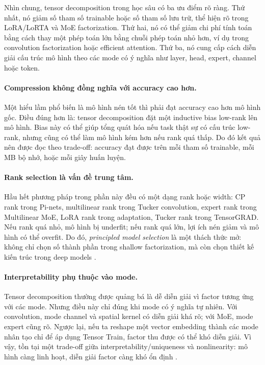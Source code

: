 Nhìn chung, tensor decomposition trong học sâu có ba ưu điểm rõ ràng. Thứ nhất, nó giảm
số tham số trainable hoặc số tham số lưu trữ, thể hiện rõ trong LoRA/LoRTA và MoE
factorization. Thứ hai, nó có thể giảm chi phí tính toán bằng cách thay một phép toán
lớn bằng chuỗi phép toán nhỏ hơn, ví dụ trong convolution factorization hoặc efficient
attention. Thứ ba, nó cung cấp cách diễn giải cấu trúc mô hình theo các mode có ý nghĩa
như layer, head, expert, channel hoặc token.

\paragraph{Compression không đồng nghĩa với accuracy cao hơn.}
Một hiểu lầm phổ biến là mô hình nén tốt thì phải đạt accuracy cao hơn mô hình gốc.
Điều đúng hơn là: tensor decomposition đặt một inductive bias low-rank lên mô hình.
Bias này có thể giúp tổng quát hóa nếu task thật sự có cấu trúc low-rank, nhưng cũng có
thể làm mô hình kém hơn nếu rank quá thấp. Do đó kết quả nên được đọc theo trade-off:
accuracy đạt được trên mỗi tham số trainable, mỗi MB bộ nhớ, hoặc mỗi giây huấn luyện.

\paragraph{Rank selection là vấn đề trung tâm.}
Hầu hết phương pháp trong phần này đều có một dạng rank hoặc width: CP rank trong
Pi-nets, multilinear rank trong Tucker convolution, expert rank trong Multilinear MoE,
LoRA rank trong adaptation, Tucker rank trong TensorGRAD. Nếu rank quá nhỏ, mô hình bị
underfit; nếu rank quá lớn, lợi ích nén giảm và mô hình có thể overfit. Do đó,
\emph{principled model selection} là một thách thức mở: không chỉ chọn số thành phần
trong shallow factorization, mà còn chọn thiết kế kiến trúc trong deep models
\cite{chrysos2025tutorial}.

\paragraph{Interpretability phụ thuộc vào mode.}
Tensor decomposition thường được quảng bá là dễ diễn giải vì factor tương ứng với các
mode. Nhưng điều này chỉ đúng khi mode có ý nghĩa tự nhiên. Với convolution, mode
channel và spatial kernel có diễn giải khá rõ; với MoE, mode expert cũng rõ. Ngược lại,
nếu ta reshape một vector embedding thành các mode nhân tạo chỉ để áp dụng Tensor Train,
factor thu được có thể khó diễn giải. Vì vậy, tồn tại một trade-off giữa
interpretability/uniqueness và nonlinearity: mô hình càng linh hoạt, diễn giải factor
càng khó ổn định \cite{chrysos2025tutorial}.

